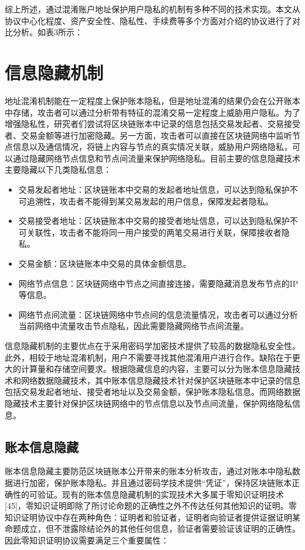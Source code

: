 综上所述，通过混淆账户地址保护用户隐私的机制有多种不同的技术实现。本文从协议中心化程度、资产安全性、隐私性、手续费等多个方面对介绍的协议进行了对比分析。如表3所示：

\section{信息隐藏机制}

地址混淆机制能在一定程度上保护账本隐私，但是地址混淆的结果仍会在公开账本中存储，攻击者可以通过分析带有特征的混淆交易一定程度上威胁用户隐私。为了增强隐私性，研究者们尝试将区块链账本中记录的信息包括交易发起者、交易接受者、交易金额等进行加密隐藏。另一方面，攻击者可以直接在区块链网络中监听节点信息以及通信情况，将链上内容与节点的真实情况关联，威胁用户网络隐私，可以通过隐藏网络节点信息和节点间流量来保护网络隐私。目前主要的信息隐藏技术主要隐藏以下几类隐私信息：

\begin{itemize}
	\item 交易发起者地址：区块链账本中交易的发起者地址信息，可以达到隐私保护不可追溯性，攻击者不能得到某交易发起的用户信息，保障发起者隐私。
	\item 交易接受者地址：区块链账本中交易的接受者地址信息，可以达到隐私保护不可关联性，攻击者不能将同一用户接受的两笔交易进行关联，保障接收者隐私。
	\item 交易金额：区块链账本中交易的具体金额信息。
	\item 网络节点信息：区块链网络中节点之间直接连接，需要隐藏消息发布节点的IP等信息。
	\item 网络节点间流量：区块链网络中节点间的信息流量情况，攻击者可以通过分析当前网络中流量攻击节点隐私，因此需要隐藏网络节点间流量。
\end{itemize}

信息隐藏机制的主要优点在于采用密码学加密技术提供了较高的数据隐私安全性。此外，相较于地址混淆机制，用户不需要寻找其他混淆用户进行合作。缺陷在于更大的计算量和存储空间要求。根据隐藏信息的内容，主要可以分为账本信息隐藏技术和网络数据隐藏技术，其中账本信息隐藏技术针对保护区块链账本中记录的信息包括交易发起者地址、接受者地址以及交易金额，保护账本隐私信息。而网络数据隐藏技术主要针对保护区块链网络中的节点信息以及节点间流量，保护网络隐私信息。

\subsection{账本信息隐藏}

账本信息隐藏主要防范区块链账本公开带来的账本分析攻击，通过对账本中隐私数据进行加密，保护账本隐私。并且通过密码学技术提供“凭证”，保持区块链账本正确性的可验证。现有的账本信息隐藏机制的实现技术大多属于零知识证明技术[45]，零知识证明即除了所讨论命题的正确性之外不传达任何其他知识的证明。零知识证明协议中存在两种角色：证明者和验证者，证明者向验证者提供证据证明某命题成立，但不泄露除结论外的其他任何信息，验证者需要验证该证明的正确性。因此零知识证明协议需要满足三个重要属性：


